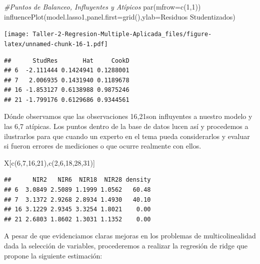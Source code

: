 \documentclass[
]{article}
\newenvironment{Shaded}{\begin{snugshade}}{\end{snugshade}}
\newcommand{\AttributeTok}[1]{\textcolor[rgb]{0.77,0.63,0.00}{#1}}
\newcommand{\CommentTok}[1]{\textcolor[rgb]{0.56,0.35,0.01}{\textit{#1}}}
\newcommand{\DecValTok}[1]{\textcolor[rgb]{0.00,0.00,0.81}{#1}}
\newcommand{\FunctionTok}[1]{\textcolor[rgb]{0.00,0.00,0.00}{#1}}
\newcommand{\NormalTok}[1]{#1}
\newcommand{\StringTok}[1]{\textcolor[rgb]{0.31,0.60,0.02}{#1}}
\begin{document}
\begin{Shaded}
\begin{Highlighting}[]
\CommentTok{\#Puntos de Balanceo, Influyentes y Atípicos}
\FunctionTok{par}\NormalTok{(}\AttributeTok{mfrow=}\FunctionTok{c}\NormalTok{(}\DecValTok{1}\NormalTok{,}\DecValTok{1}\NormalTok{))}
\FunctionTok{influencePlot}\NormalTok{(model.lasso1,}\AttributeTok{panel.first=}\FunctionTok{grid}\NormalTok{(),}\AttributeTok{ylab=}\StringTok{\textquotesingle{}Residuos Studentizados\textquotesingle{}}\NormalTok{)}
\end{Highlighting}
\end{Shaded}

\texttt{[image: Taller-2-Regresion-Multiple-Aplicada\_files/figure-latex/unnamed-chunk-16-1.pdf]}

\begin{verbatim}
##      StudRes       Hat     CookD
## 6  -2.111444 0.1424941 0.1288001
## 7   2.006935 0.1431940 0.1189678
## 16 -1.853127 0.6138988 0.9875246
## 21 -1.799176 0.6129686 0.9344561
\end{verbatim}

Dónde observamos que las observaciones 16,21son influyentes a nuestro
modelo y las 6,7 atípicas. Los puntos dentro de la base de datos lucen
así y procedemos a ilustrarlos para que cuando un experto en el tema
pueda considerarlos y evaluar si fueron errores de mediciones o que
ocurre realmente con ellos.

\begin{Shaded}
\begin{Highlighting}[]
\NormalTok{X[}\FunctionTok{c}\NormalTok{(}\DecValTok{6}\NormalTok{,}\DecValTok{7}\NormalTok{,}\DecValTok{16}\NormalTok{,}\DecValTok{21}\NormalTok{),}\FunctionTok{c}\NormalTok{(}\DecValTok{2}\NormalTok{,}\DecValTok{6}\NormalTok{,}\DecValTok{18}\NormalTok{,}\DecValTok{28}\NormalTok{,}\DecValTok{31}\NormalTok{)]}
\end{Highlighting}
\end{Shaded}

\begin{verbatim}
##      NIR2   NIR6  NIR18  NIR28 density
## 6  3.0849 2.5089 1.1999 1.0562   60.48
## 7  3.1372 2.9268 2.8934 1.4930   40.10
## 16 3.1229 2.9345 3.3254 1.8021    0.00
## 21 2.6803 1.8602 1.3031 1.1352    0.00
\end{verbatim}

A pesar de que evidenciamos claras mejoras en los problemas de
multicolinealidad dada la selección de variables, procederemos a
realizar la regresión de ridge que propone la siguiente estimación:
\end{document}
